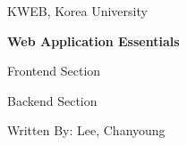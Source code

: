 \begin{titlepage}
    \centering
    \vspace*{35mm}
    \par\vspace{5mm}
    {\large KWEB, Korea University}
    \par\vspace{20mm}
    {
        \huge\bfseries Web Application Essentials
        \begin{frontend}\par\large Frontend Section\end{frontend}
        \begin{backend}\par\large Backend Section\end{backend}
    }
    \par\vspace{30mm}
    {\large Written By: Lee, Chanyoung}
    \par\vspace{30mm}
    {\large\version}
\end{titlepage}

\dominitoc
\tableofcontents
\setimgdir
